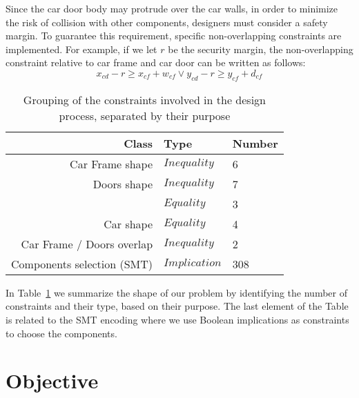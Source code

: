 Since the car door body may protrude over the car walls, in order to
minimize the risk of collision with other components, designers
must consider a safety margin. To
guarantee this requirement, specific non-overlapping constraints are 
implemented. For example, if we let $r$ be the security margin, the 
non-overlapping constraint relative to car frame and car door can be written 
as follows:
\begin{equation}
\label{eq:superpos}
x_{cd} - r \geq x_{cf} + w_{cf} \lor y_{cd} - r \geq y_{cf} + d_{cf}
\end{equation}

\begin{table}[t]
	\setlength{\tabcolsep}{20pt}
	\caption{\label{tab:constraints} Grouping of the constraints
		involved in the design process, separated by their 
		purpose}
	\centering
	\begin{tabular}{rll}
		\toprule
		\textbf{Class} & \textbf{Type} & \textbf{Number} \\
		\midrule
		Car Frame shape & $Inequality$ & 6 \\
		Doors shape & $Inequality$ & 7 \\
		& $Equality$ & 3 \\
		Car shape & $Equality$ & 4 \\
		Car Frame / Doors overlap & $Inequality$ & 2 \\
		Components selection (SMT) & $Implication$ & 308 \\
		\bottomrule 
	\end{tabular}
\end{table}

In Table~\ref{tab:constraints} we summarize the shape of our problem
by identifying the number of constraints and their type, based on their
purpose. The last element of the Table is related to the SMT encoding
where we use Boolean implications as constraints to choose the components.

\section{Objective}
\label{sec:objective}

